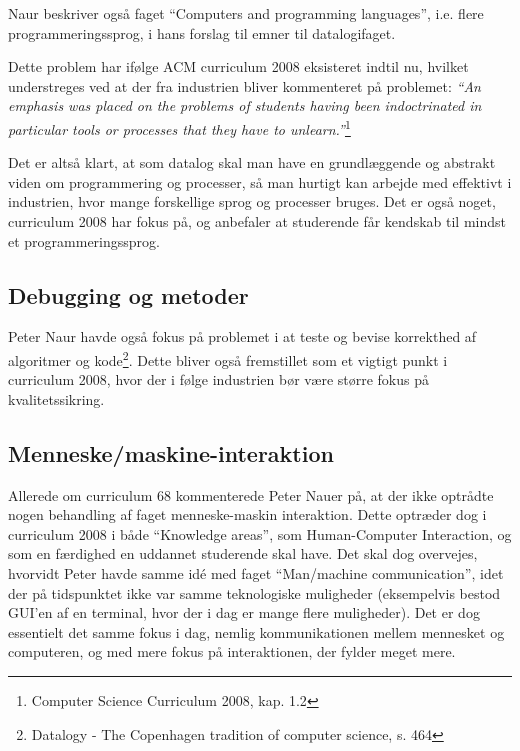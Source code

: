 \documentclass[10pt,a4paper]{article}
\newcommand{\citat}[2]{\vspace{0.1cm}\newline\textit{``#1''}\hspace{0.1cm}\footnote{#2}\vspace{0.1cm}\newline}
\begin{document}
Naur beskriver også faget ``Computers and programming languages'', i.e. flere
programmeringssprog, i hans forslag til emner til datalogifaget. 

Dette problem har ifølge ACM curriculum 2008 eksisteret indtil nu, hvilket
understreges ved at der fra industrien bliver kommenteret på problemet:
\citat{An emphasis was placed on the problems of students having been
    indoctrinated in particular tools or processes that they have to
    unlearn.}{Computer Science Curriculum 2008, kap. 1.2}

Det er altså klart, at som datalog skal man have en grundlæggende og abstrakt
viden om programmering og processer, så man hurtigt kan arbejde med effektivt i
industrien, hvor mange forskellige sprog og processer bruges. Det er også noget,
curriculum 2008 har fokus på, og anbefaler at studerende får kendskab til mindst
et programmeringssprog.

\subsection{Debugging og metoder}
Peter Naur havde også fokus på problemet i at teste og bevise korrekthed af
algoritmer og kode\footnote{Datalogy - The Copenhagen tradition
    of computer science, s. 464}. Dette bliver også fremstillet som et vigtigt punkt i
curriculum 2008, hvor der i følge industrien bør være større fokus på
kvalitetssikring. 

\subsection{Menneske/maskine-interaktion}
Allerede om curriculum 68 kommenterede Peter Nauer på, at der ikke optrådte
nogen behandling af faget menneske-maskin interaktion. Dette optræder dog i
curriculum 2008 i både ``Knowledge areas'', som Human-Computer Interaction, og
som en færdighed en uddannet studerende skal have. Det skal dog overvejes,
hvorvidt Peter havde samme idé med faget ``Man/machine communication'', idet der
på tidspunktet ikke var samme teknologiske muligheder (eksempelvis bestod GUI'en
af en terminal, hvor der i dag er mange flere muligheder). Det er dog essentielt
det samme fokus i dag, nemlig kommunikationen mellem mennesket og computeren, og
med mere fokus på interaktionen, der fylder meget mere.
\end{document}
